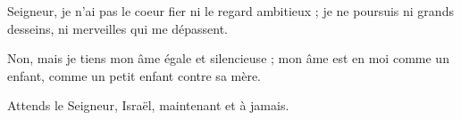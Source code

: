 \item Seigneur, je n'ai pas le coeur fier ni le regard ambitieux ; je ne poursuis ni grands desseins, ni merveilles qui me dépassent.

\item Non, mais je tiens mon âme égale et silencieuse ; mon âme est en moi comme un enfant, comme un petit enfant contre sa mère.

\item Attends le Seigneur, Israël, maintenant et à jamais.